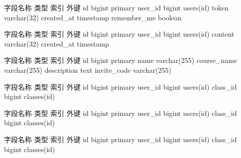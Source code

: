 {}\markdownRendererInterblockSeparator
{}\begin{center}\markdownRendererInterblockSeparator
{}%
{{字段名称}%
{类型}%
{索引}%
{外键}%
}%
{{id}%
{bigint}%
{primary}%
{}%
}%
{{user\_id}%
{bigint}%
{}%
{users(id)}%
}%
{{token}%
{varchar(32)}%
{}%
{}%
}%
{{created\_at}%
{timestamp}%
{}%
{}%
}%
{{remember\_me}%
{boolean}%
{}%
{}%
}%
\markdownRendererInterblockSeparator
{}\end{center}\markdownRendererInterblockSeparator
{}\markdownRendererInterblockSeparator
{}\begin{center}\markdownRendererInterblockSeparator
{}%
{{字段名称}%
{类型}%
{索引}%
{外键}%
}%
{{id}%
{bigint}%
{primary}%
{}%
}%
{{user\_id}%
{bigint}%
{}%
{users(id)}%
}%
{{content}%
{varchar(32)}%
{}%
{}%
}%
{{created\_at}%
{timestamp}%
{}%
{}%
}%
\markdownRendererInterblockSeparator
{}\end{center}\markdownRendererInterblockSeparator
{}\markdownRendererInterblockSeparator
{}\begin{center}\markdownRendererInterblockSeparator
{}%
{{字段名称}%
{类型}%
{索引}%
{外键}%
}%
{{id}%
{bigint}%
{primary}%
{}%
}%
{{name}%
{varchar(255)}%
{}%
{}%
}%
{{course\_name}%
{varchar(255)}%
{}%
{}%
}%
{{description}%
{text}%
{}%
{}%
}%
{{invite\_code}%
{varchar(255)}%
{}%
{}%
}%
\markdownRendererInterblockSeparator
{}\end{center}\markdownRendererInterblockSeparator
{}\markdownRendererInterblockSeparator
{}\begin{center}\markdownRendererInterblockSeparator
{}%
{{字段名称}%
{类型}%
{索引}%
{外键}%
}%
{{id}%
{bigint}%
{primary}%
{}%
}%
{{user\_id}%
{bigint}%
{}%
{users(id)}%
}%
{{class\_id}%
{bigint}%
{}%
{classes(id)}%
}%
\markdownRendererInterblockSeparator
{}\end{center}\markdownRendererInterblockSeparator
{}\markdownRendererInterblockSeparator
{}\begin{center}\markdownRendererInterblockSeparator
{}%
{{字段名称}%
{类型}%
{索引}%
{外键}%
}%
{{id}%
{bigint}%
{primary}%
{}%
}%
{{user\_id}%
{bigint}%
{}%
{users(id)}%
}%
{{class\_id}%
{bigint}%
{}%
{classes(id)}%
}%
\markdownRendererInterblockSeparator
{}\end{center}\markdownRendererInterblockSeparator
{}\markdownRendererInterblockSeparator
{}\begin{center}\markdownRendererInterblockSeparator
{}%
{{字段名称}%
{类型}%
{索引}%
{外键}%
}%
{{id}%
{bigint}%
{primary}%
{}%
}%
{{user\_id}%
{bigint}%
{}%
{users(id)}%
}%
{{class\_id}%
{bigint}%
{}%
{classes(id)}%
}%
\markdownRendererInterblockSeparator
{}\end{center}\relax